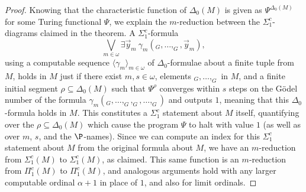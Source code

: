 \documentclass{amsart}
\newcommand{\yvec}{\vec{y}}
\begin{document}
\begin{proof}
Knowing that the characteristic function of $\Delta_0(M)$ is given as $\Psi^{\Delta_0(M)}$
for some Turing functional $\Psi$, we explain the $m$-reduction between the $\Sigma_1^c$-diagrams
claimed in the theorem.
A $\Sigma_1^c$-formula
$$\bigvee_{m\in\omega} \exists\yvec_m~\gamma_m(_G,\ldots,_G,\yvec_m), $$
using a computable sequence $\langle\gamma_m\rangle_{m\in\omega}$ of $\Delta_0$-formulae about
a finite tuple from $M$, holds in $M$ just if there exist $m,s\in\omega$, elements
$_G,\ldots,_G$ in $M$, and a finite initial segment $\rho\subseteq\Delta_0(M)$
such that $\Psi^{\rho}$ converges within $s$ steps on the G\"odel number of the formula
$\gamma_m(_G,\ldots,_G,_G,\ldots,_G)$
and outputs $1$, meaning that this $\Delta_0$-formula holds in $M$.
This constitutes
a $\Sigma_1^c$ statement about $M$ itself, quantifying over the $\rho\subseteq\Delta_0(M)$
which cause the program $\Psi$ to halt with value $1$ (as well as over $m$, $s$, and the $\P$-names).
Since we can compute an index for this $\Sigma_1^c$ statement about $M$ from the original
formula about $M$, we have an $m$-reduction from $\Sigma_1^c(M)$ to $\Sigma_1^c(M)$,
as claimed.
This same function is an $m$-reduction from $\Pi_1^c(M)$ to $\Pi_1^c(M)$,
and analogous arguments hold with any larger computable ordinal $\alpha+1$ in place of $1$,
and also for limit ordinals.
\end{proof}
\end{document}
